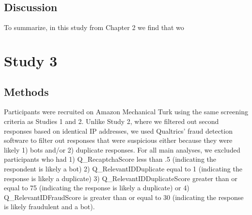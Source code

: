 \documentclass[a4paper,nobind]{templates/ociamthesis}
\begin{document}
\hypertarget{discussion-1}{%
\subsection{Discussion}\label{discussion-1}}

To summarize, in this study from Chapter 2 we find that wo

\hypertarget{study-3}{%
\section{Study 3}\label{study-3}}

\hypertarget{methods-2}{%
\subsection{Methods}\label{methods-2}}

Participants were recruited on Amazon Mechanical Turk using the same screening criteria as Studies 1 and 2. Unlike Study 2, where we filtered out second responses based on identical IP addresses, we used Qualtrics' fraud detection software to filter out responses that were suspicious either because they were likely 1) bots and/or 2) duplicate responses. For all main analyses, we excluded participants who had 1) Q\_RecaptchaScore less than .5 (indicating the respondent is likely a bot) 2) Q\_RelevantIDDuplicate equal to 1 (indicating the response is likely a duplicate) 3) Q\_RelevantIDDuplicateScore greater than or equal to 75 (indicating the response is likely a duplicate) or 4) Q\_RelevantIDFraudScore is greater than or equal to 30 (indicating the response is likely fraudulent and a bot).
\end{document}

